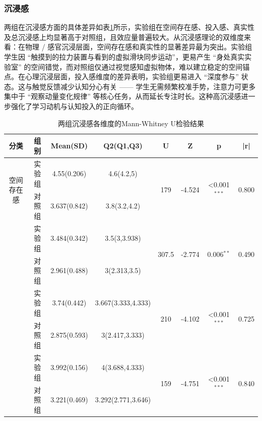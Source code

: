 \documentclass[runningheads]{llncs}
\begin{document}
\subsubsection{沉浸感}
两组在沉浸感方面的具体差异如表\ref{tab:immersion}所示，实验组在空间存在感、投入感、真实性及总沉浸感上均显著高于对照组，且效应量普遍较大。从沉浸感理论的双维度来看：在物理 / 感官沉浸层面，空间存在感和真实性的显著差异最为突出。实验组学生因 “触摸到的拉力装置与看到的虚拟滑块同步运动”，更易产生 “身处真实实验室” 的空间错觉，而对照组仅通过视觉感知虚拟物体，难以建立稳定的空间锚点。在心理沉浸层面，投入感维度的差异表明，实验组更易进入 “深度参与” 状态。这与触觉反馈减少认知分心有关 —— 学生无需频繁校准手势，注意力可更多集中于 “观察动量变化规律” 等核心任务，从而延长专注时长。这种高沉浸感进一步强化了学习动机与认知投入的正向循环。

\begin{table}[t]
\centering
\setlength{\tabcolsep}{2pt} %
\caption{两组沉浸感各维度的Mann-Whitney U检验结果}
\label{tab:immersion}
\begin{tabular}{cccccccc}
\toprule
\textbf{分类} & \textbf{组别} & \textbf{Mean(SD)} & \textbf{Q2(Q1,Q3)} & \textbf{U} & \textbf{Z} & \textbf{p} & \textbf{|r|} \\
\midrule
\multirow{2}{*}{空间存在感} 
& 实验组 & 4.55(0.206) & 4.6(4.2,5) & \multirow{2}{*}{179} & \multirow{2}{*}{-4.524} & \multirow{2}{*}{<0.001\(^{***}\)} & \multirow{2}{*}{0.800} \\
& 对照组 & 3.637(0.842) & 3.8(3.2,4.2) \\
\addlinespace
\multirow{2}{*}{投入感} 
& 实验组 & 3.484(0.342) & 3.5(3,3.938) & \multirow{2}{*}{307.5} & \multirow{2}{*}{-2.774} & \multirow{2}{*}{0.006\(^{**}\)} & \multirow{2}{*}{0.490} \\
& 对照组 & 2.961(0.488) & 3(2.313,3.5) \\
\addlinespace
\multirow{2}{*}{真实性} 
& 实验组 & 3.74(0.442) & 3.667(3.333,4.333) & \multirow{2}{*}{210} & \multirow{2}{*}{-4.102} & \multirow{2}{*}{<0.001\(^{***}\)} & \multirow{2}{*}{0.725} \\
& 对照组 & 2.875(0.593) & 3(2.417,3.333) \\
\addlinespace
\multirow{2}{*}{沉浸感} 
& 实验组 & 3.992(0.156) & 4(3.688,4.333) & \multirow{2}{*}{159} & \multirow{2}{*}{-4.751} & \multirow{2}{*}{<0.001\(^{***}\)} & \multirow{2}{*}{0.840} \\
& 对照组 & 3.221(0.469) & 3.292(2.771,3.646) \\
\bottomrule
\end{tabular}
\end{table}
\end{document}
